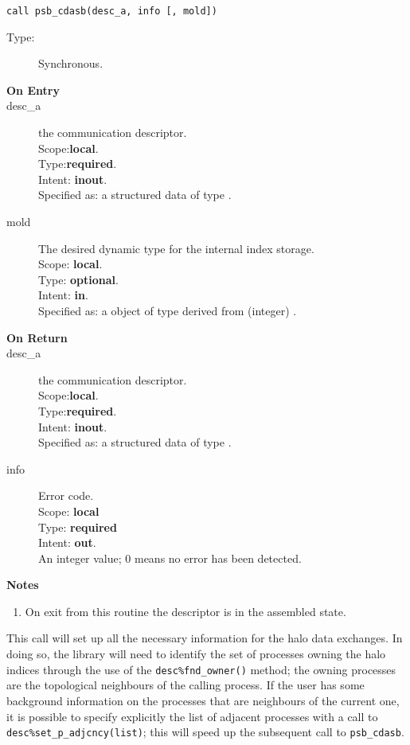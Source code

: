 \begin{verbatim}
call psb_cdasb(desc_a, info [, mold])
\end{verbatim}

\begin{description}
\item[Type:] Synchronous.
\item[\bf On Entry]
\item[desc\_a] the communication descriptor.\\
Scope:{\bf local}.\\
Type:{\bf required}.\\
Intent: {\bf inout}.\\
Specified as: a structured data of type \descdata.
\item[mold] The desired dynamic type for the internal index storage.\\
Scope: {\bf local}.\\
Type: {\bf optional}.\\
Intent: {\bf in}.\\
Specified as: a object of type derived from (integer) \vbasedata.
\end{description}

\begin{description}
\item[\bf On Return]
\item[desc\_a] the communication descriptor.\\
Scope:{\bf local}.\\
Type:{\bf required}.\\
Intent: {\bf inout}.\\
Specified as: a structured data of type \descdata.
\item[info] Error code.\\
Scope: {\bf local} \\
Type: {\bf required} \\
Intent: {\bf out}.\\
An integer value; 0 means no error has been detected. 
\end{description}
{\par\noindent\large\bfseries Notes}
\begin{enumerate}
\item On exit from this routine the descriptor is in the assembled
  state. 
\end{enumerate}
This call will set up all the necessary information for the halo data
exchanges. In doing so, the library will need to identify the set of
processes owning the halo indices through the use of the
\verb|desc%fnd_owner()|  method; the owning processes are the
topological neighbours of the calling process. If the user has some
background information on the processes that are neighbours of the
current one, it is possible to specify explicitly the list of adjacent
processes with a call to  \verb|desc%set_p_adjcncy(list)|; this will
speed up the subsequent call to  \verb|psb_cdasb|. 

